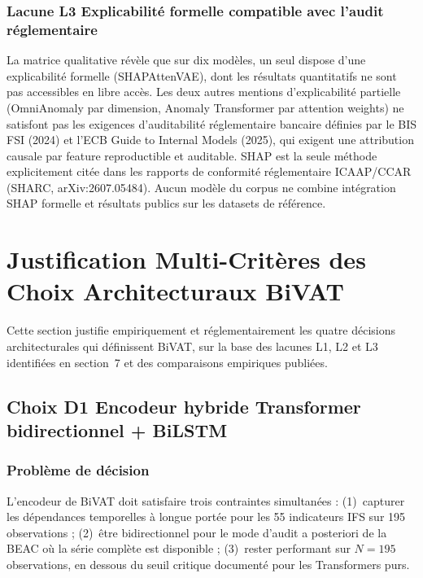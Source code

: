 \documentclass[12pt,a4paper]{article}
\begin{document}
\subsubsection{Lacune L3  Explicabilité formelle compatible avec l'audit
réglementaire}

La matrice qualitative révèle que sur dix modèles, un seul dispose d'une
explicabilité formelle (SHAPAttenVAE), dont les résultats quantitatifs ne sont
pas accessibles en libre accès. Les deux autres mentions d'explicabilité partielle
(OmniAnomaly par dimension, Anomaly Transformer par attention weights) ne
satisfont pas les exigences d'auditabilité réglementaire bancaire définies par
le BIS FSI (2024) et l'ECB Guide to Internal Models (2025), qui exigent une
attribution causale par feature reproductible et auditable. SHAP est la seule
méthode explicitement citée dans les rapports de conformité réglementaire
ICAAP/CCAR (SHARC, arXiv:2607.05484). Aucun modèle du corpus ne combine
intégration SHAP formelle et résultats publics sur les datasets de référence.

\section{Justification Multi-Critères des Choix Architecturaux BiVAT}

Cette section justifie empiriquement et réglementairement les quatre décisions
architecturales qui définissent BiVAT, sur la base des lacunes L1, L2 et L3
identifiées en section~7 et des comparaisons empiriques publiées.

\subsection{Choix D1  Encodeur hybride Transformer bidirectionnel + BiLSTM}

\subsubsection{Problème de décision}

L'encodeur de BiVAT doit satisfaire trois contraintes simultanées : (1)~capturer
les dépendances temporelles à longue portée pour les 55 indicateurs IFS sur
195 observations ; (2)~être bidirectionnel pour le mode d'audit a posteriori
de la BEAC où la série complète est disponible ; (3)~rester performant sur
$N = 195$ observations, en dessous du seuil critique documenté pour les
Transformers purs.
\end{document}
